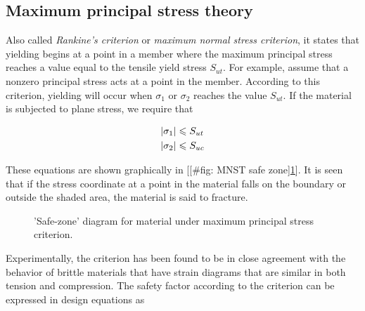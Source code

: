 \documentclass[a4paper,openany,12pt]{book}
\begin{document}
\subsection{Maximum principal stress theory}
\label{maximum-principal-stress-theory}
Also called \emph{Rankine's criterion} or \emph{maximum normal stress criterion},
it states that yielding begins at a point in a member where the maximum
principal stress reaches a value equal to the tensile yield stress
\(S_{ut}\). For example, assume that a nonzero principal stress acts at a
point in the member. According to this criterion, yielding will occur
when \(\sigma_1\) or \(\sigma_2\) reaches the value \(S_{ut}\). If the
material is subjected to plane stress, we require that

$$\begin{gathered}
    \left| \sigma _1 \right| \leqslant S_{ut} \hfill \\
    \left| \sigma _2 \right| \leqslant S_{uc} \hfill \\ 
  \end{gathered}$$

These equations are shown graphically in
[[\#fig: MNST safe zone]\ref{fig: MNST safe zone}]. It is seen that if the
stress coordinate at a point in the material falls on the boundary or
outside the shaded area, the material is said to fracture.

\begin{figure}[h]
  \centering
  \caption{'Safe-zone' diagram for material under maximum principal stress criterion.}
  \label{fig: MNST safe zone}
\end{figure}

Experimentally, the criterion has been found to be in close agreement
with the behavior of brittle materials that have strain diagrams that
are similar in both tension and compression. The safety factor according
to the criterion can be expressed in design equations as
\end{document}
